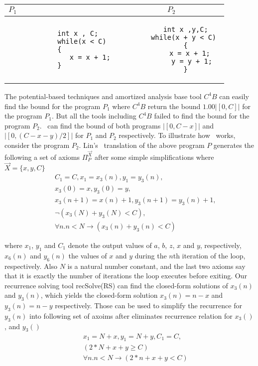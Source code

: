 \begin{center}
	\begin{tabular}{ l | c }
		\textbf{$P_1$}&\textbf{$P_2$}\\\hline
		\begin{minipage}{0.2\textwidth}
			\begin{verbatim}
			int x , C;
			while(x < C) 
			{
			   x = x + 1; 
			}
			\end{verbatim}
		\end{minipage} 
	     & 
	\begin{minipage}{0.2\textwidth}
		\begin{verbatim}
	   int x ,y,C;
	   while(x + y < C) 
	   {
	      x = x + 1; 
	      y = y + 1;
	   }
	\end{verbatim}
	\end{minipage}
    
	\end{tabular}
\end{center}

The potential-based techniques and amortized analysis base tool $C^{4}B$ can easily find the bound for the program $P_1$ where $C^{4}B$ return the bound $1.00 |[0, C]|$ for the program $P_1$. But all the tools including $C^{4}B$ failed to find the bound for the program $P_2$. \SystemName\ can find the bound of both programs $ |[0, C-x]|$ and $ |[0, (C-x-y)/2]|$ for $P_1$ and $P_2$ respectively. To illustrate how \SystemName\ works, consider the program $P_2$. Lin's~\cite{Lin20161} translation of the above program $P$ generates the following a set of axioms $\Pi^{\vec{X}}_{P}$ after some simple simplifications where $\vec{X}=\{x,y,C\}$
\begin{eqnarray*}
	&& C_1=C , x_1 = x_3(n), y_1 = y_3(n), \\
	&& x_3(0) = x, y_3(0) = y, \\
	&& x_3(n+1) = x(n)+1, y_3(n+1) = y_3(n)+1, \\
	&&\neg (x_3(N)+y_3(N)<C), \\
	&& \forall n. n<N\rightarrow (x_3(n)+y_3(n)<C)
\end{eqnarray*}

where  $x_1$, $y_1$ and $C_1$ denote the output values of $a$, $b$, $z$, $x$ and $y$, respectively,
$x_6(n)$ and $y_6(n)$ the values of $x$ and $y$ during the $n$th iteration
of the loop, respectively. Also
$N$ is a natural number constant, and the last two axioms say that it
is exactly the number of iterations the loop executes before exiting. Our recurrence solving tool recSolve(RS) can find the closed-form solutions of $x_3(n)$ and $y_3(n)$, which yields the closed-form solution $x_3(n)=n-x$ and $y_3(n)=n-y$ respectively. Those can be used to simplify the recurrence for $y_3(n)$ into following set of axoims after eliminates recurrence relation for $x_3()$, and $y_3()$
\begin{eqnarray*}
	&& x_1 = N+x, y_1 = N+y, C_1=C,\\
	&& (2*N+x+y \geq C) \\
	&& \forall n. n<N\rightarrow (2*n+x+y<C)
\end{eqnarray*}

